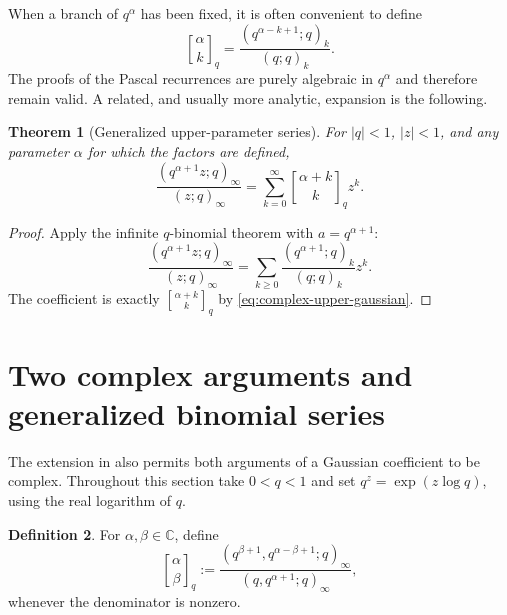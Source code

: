 \documentclass[11pt,oneside,openany]{book}
\newtheorem{theorem}{Theorem}[chapter]
\theoremstyle{definition}
\newtheorem{definition}[theorem]{Definition}
\theoremstyle{remark}
\newcommand{\Qbinom}[3]{\genfrac{[}{]}{0pt}{}{#1}{#2}_{#3}}
\newcommand{\C}{\mathbb C}
\newcommand{\abs}[1]{\lvert #1\rvert}
\begin{document}
When a branch of $q^\alpha$ has been fixed, it is often convenient to define
\[
 \Qbinom{\alpha}{k}q
 =\frac{(q^{\alpha-k+1};q)_k}{(q;q)_k}.
 \tag{17.6}\label{eq:complex-upper-gaussian}
\]
The proofs of the Pascal recurrences are purely algebraic in $q^\alpha$ and therefore remain valid.  A related, and usually more analytic, expansion is the following.

\begin{theorem}[Generalized upper-parameter series]\label{thm:upper-parameter-series}
For $\abs q<1$, $\abs z<1$, and any parameter $\alpha$ for which the factors are defined,
\[
 \frac{(q^{\alpha+1}z;q)_\infty}{(z;q)_\infty}
 =\sum_{k=0}^{\infty}
   \Qbinom{\alpha+k}{k}q z^k.
 \tag{17.7}\label{eq:upper-parameter-series}
\]
\end{theorem}

\begin{proof}
Apply the infinite $q$-binomial theorem with $a=q^{\alpha+1}$:
\[
 \frac{(q^{\alpha+1}z;q)_\infty}{(z;q)_\infty}
 =\sum_{k\ge0}\frac{(q^{\alpha+1};q)_k}{(q;q)_k}z^k.
\]
The coefficient is exactly $\Qbinom{\alpha+k}{k}q$ by \eqref{eq:complex-upper-gaussian}.
\end{proof}

\section{Two complex arguments and generalized binomial series}

The extension in  also permits both arguments of a Gaussian coefficient to be complex.  Throughout this section take $0<q<1$ and set $q^z=\exp(z\log q)$, using the real logarithm of $q$.

\begin{definition}\label{def:complex-gaussian}
For $\alpha,\beta\in\C$, define
\[
 \genfrac{[}{]}{0pt}{}{\alpha}{\beta}_q
 :=\frac{(q^{\beta+1},q^{\alpha-\beta+1};q)_\infty}
 {(q,q^{\alpha+1};q)_\infty},
 \tag{17.8}\label{eq:complex-gaussian}
\]
whenever the denominator is nonzero.
\end{definition}
\end{document}
